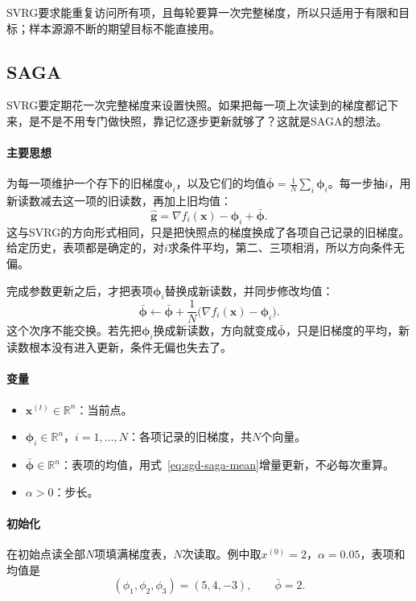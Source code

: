 SVRG要求能重复访问所有项，且每轮要算一次完整梯度，所以只适用于有限和目标；样本源源不断的期望目标不能直接用。

\subsection{SAGA}
\label{sec:sgd-saga}

SVRG要定期花一次完整梯度来设置快照。如果把每一项上次读到的梯度都记下来，是不是不用专门做快照，靠记忆逐步更新就够了？这就是SAGA的想法。

\paragraph{主要思想}
为每一项维护一个存下的旧梯度$\bm{\phi}_i$，以及它们的均值$\bar{\bm{\phi}}=\frac1N\sum_i\bm{\phi}_i$。每一步抽$i$，用新读数减去这一项的旧读数，再加上旧均值：
\begin{equation}
 \hat{\bm{g}}=\nabla f_i(\bm{x})-\bm{\phi}_i+\bar{\bm{\phi}}.
 \label{eq:sgd-saga-direction}
\end{equation}
这与SVRG的方向形式相同，只是把快照点的梯度换成了各项自己记录的旧梯度。给定历史，表项都是确定的，对$i$求条件平均，第二、三项相消，所以方向条件无偏。

完成参数更新之后，才把表项$\bm{\phi}_i$替换成新读数，并同步修改均值：
\begin{equation}
 \bar{\bm{\phi}}\leftarrow\bar{\bm{\phi}}+\frac{1}{N}\bigl(\nabla f_i(\bm{x})-\bm{\phi}_i\bigr).
 \label{eq:sgd-saga-mean}
\end{equation}
这个次序不能交换。若先把$\bm{\phi}_i$换成新读数，方向就变成$\bar{\bm{\phi}}$，只是旧梯度的平均，新读数根本没有进入更新，条件无偏也失去了。

\paragraph{变量}
\begin{itemize}
 \item $\bm{x}^{(t)}\in\mathbb{R}^n$：当前点。
 \item $\bm{\phi}_i\in\mathbb{R}^n$，$i=1,\ldots,N$：各项记录的旧梯度，共$N$个向量。
 \item $\bar{\bm{\phi}}\in\mathbb{R}^n$：表项的均值，用式~\eqref{eq:sgd-saga-mean}增量更新，不必每次重算。
 \item $\alpha>0$：步长。
\end{itemize}

\paragraph{初始化}
在初始点读全部$N$项填满梯度表，$N$次读取。例中取$x^{(0)}=2$，$\alpha=0.05$，表项和均值是
\[
 (\phi_1,\phi_2,\phi_3)=(5,4,-3),\qquad \bar{\phi}=2.
\]

